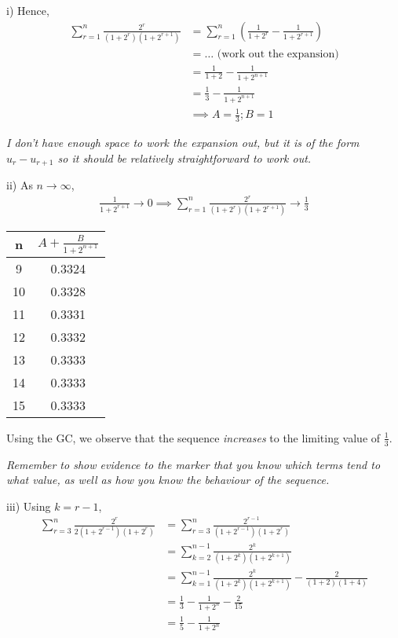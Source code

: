 \documentclass[12pt, a4paper, titlepage]{article}
\begin{document}
i)
Hence,
\begin{align*}
    \sum_{r = 1}^n \frac{2^r}{(1 + 2^r)(1 + 2^{r + 1})} &= \sum_{r = 1}^n (\frac{1}{1 + 2^r} - \frac{1}{1 + 2^{r + 1}}) \\
    &= \dots \text{ (work out the expansion)} \\
    &= \frac{1}{1 + 2} - \frac{1}{1 + 2^{n + 1}} \\
    &= \frac{1}{3} - \frac{1}{1 + 2^{n + 1}} \\
    &\implies A = \frac{1}{3}; B = 1
\end{align*}

\emph{I don't have enough space to work the expansion out, but it is of the form $u_r - u_{r + 1}$ so it should be relatively straightforward to work out.}

ii)
As $n \rightarrow \infty$,
\begin{align*}
    \frac{1}{1 + 2^{r + 1}} \rightarrow 0
    \implies \sum_{r = 1}^n \frac{2^r}{(1 + 2^r)(1 + 2^{r + 1})} \rightarrow \frac{1}{3}
\end{align*}

\begin{minipage}{0.3\textwidth}
    \begin{tabular}{c|c}
        n & $A + \frac{B}{1 + 2^{n + 1}}$ \\
        \hline
        9 & 0.3324 \\
        \hline
        10 & 0.3328 \\
        \hline
        11 & 0.3331 \\
        \hline
        12 & 0.3332 \\
        \hline
        13 & 0.3333 \\
        \hline
        14 & 0.3333 \\
        \hline
        15 & 0.3333
    \end{tabular}
\end{minipage}
\begin{minipage}{0.6\textwidth}
    Using the GC, we observe that the sequence \emph{increases} to the limiting value of $\frac{1}{3}$.
\end{minipage}

\emph{Remember to show evidence to the marker that you know which terms tend to what value, as well as how you know the behaviour of the sequence.}

iii)
Using $k = r - 1$,
\begin{align*}
    \sum_{r = 3}^n \frac{2^r}{2(1 + 2^{r - 1})(1 + 2^r)} &= \sum_{r = 3}^n\frac{2^{r - 1}}{(1 + 2^{r - 1})(1 + 2^r)} \\
    &= \sum_{k = 2}^{n - 1} \frac{2^k}{(1 + 2^k)(1 + 2^{k + 1})} \\
    &= \sum_{k = 1}^{n - 1} \frac{2^k}{(1 + 2^k)(1 + 2^{k + 1})} - \frac{2}{(1 + 2)(1 + 4)} \\
    &= \frac{1}{3} - \frac{1}{1 + 2^n} - \frac{2}{15} \\
    &= \frac{1}{5} - \frac{1}{1 + 2^n}
\end{align*}
\end{document}
